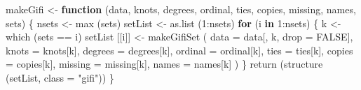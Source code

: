 \documentclass[
  12pt,
]{book}
\newenvironment{Shaded}{\begin{snugshade}}{\end{snugshade}}
\newcommand{\AttributeTok}[1]{\textcolor[rgb]{0.77,0.63,0.00}{#1}}
\newcommand{\ConstantTok}[1]{\textcolor[rgb]{0.00,0.00,0.00}{#1}}
\newcommand{\ControlFlowTok}[1]{\textcolor[rgb]{0.13,0.29,0.53}{\textbf{#1}}}
\newcommand{\DecValTok}[1]{\textcolor[rgb]{0.00,0.00,0.81}{#1}}
\newcommand{\FunctionTok}[1]{\textcolor[rgb]{0.00,0.00,0.00}{#1}}
\newcommand{\NormalTok}[1]{#1}
\newcommand{\OtherTok}[1]{\textcolor[rgb]{0.56,0.35,0.01}{#1}}
\newcommand{\SpecialCharTok}[1]{\textcolor[rgb]{0.00,0.00,0.00}{#1}}
\newcommand{\StringTok}[1]{\textcolor[rgb]{0.31,0.60,0.02}{#1}}
\begin{document}
\begin{Shaded}
\begin{Highlighting}[]
\NormalTok{makeGifi }\OtherTok{\textless{}{-}}
  \ControlFlowTok{function}\NormalTok{ (data,}
\NormalTok{            knots,}
\NormalTok{            degrees,}
\NormalTok{            ordinal,}
\NormalTok{            ties,}
\NormalTok{            copies,}
\NormalTok{            missing,}
\NormalTok{            names,}
\NormalTok{            sets) \{}
\NormalTok{    nsets }\OtherTok{\textless{}{-}} \FunctionTok{max}\NormalTok{ (sets)}
\NormalTok{    setList }\OtherTok{\textless{}{-}} \FunctionTok{as.list}\NormalTok{ (}\DecValTok{1}\SpecialCharTok{:}\NormalTok{nsets)}
    \ControlFlowTok{for}\NormalTok{ (i }\ControlFlowTok{in} \DecValTok{1}\SpecialCharTok{:}\NormalTok{nsets) \{}
\NormalTok{      k }\OtherTok{\textless{}{-}} \FunctionTok{which}\NormalTok{ (sets }\SpecialCharTok{==}\NormalTok{ i)}
\NormalTok{      setList [[i]] }\OtherTok{\textless{}{-}}
        \FunctionTok{makeGifiSet}\NormalTok{ (}
          \AttributeTok{data =}\NormalTok{ data[, k, }\AttributeTok{drop =} \ConstantTok{FALSE}\NormalTok{],}
          \AttributeTok{knots =}\NormalTok{ knots[k],}
          \AttributeTok{degrees =}\NormalTok{ degrees[k],}
          \AttributeTok{ordinal =}\NormalTok{ ordinal[k],}
          \AttributeTok{ties =}\NormalTok{ ties[k],}
          \AttributeTok{copies =}\NormalTok{ copies[k],}
          \AttributeTok{missing =}\NormalTok{ missing[k],}
          \AttributeTok{names =}\NormalTok{ names[k]}
\NormalTok{        )}
\NormalTok{    \}}
    \FunctionTok{return}\NormalTok{ (}\FunctionTok{structure}\NormalTok{ (setList, }\AttributeTok{class =} \StringTok{"gifi"}\NormalTok{))}
\NormalTok{  \}}


\end{Highlighting}
\end{Shaded}
\end{document}
